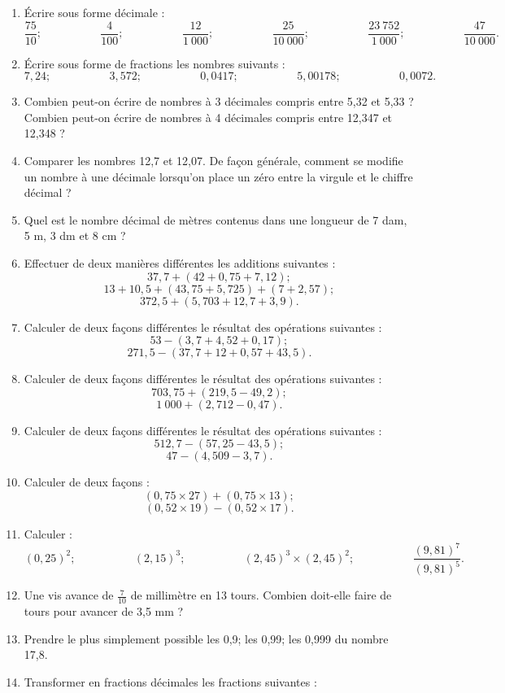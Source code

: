\documentclass[12 pt]{extarticle}
\theoremstyle{plain}
\begin{document}
 \begin{enumerate}
 \item Écrire sous forme décimale : 
 \[ \frac{75}{10};\phantom{meowmeow}\frac4{100};\phantom{meowmeow}\frac{12}{1~000};\phantom{meowmeow}\frac{25}{10~000};\phantom{meowmeow}\frac{23~752}{1~000};\phantom{meowmeow}\frac{47}{10~000}.\]
 \item Écrire sous forme de fractions les nombres suivants : 
 \[7,24; \phantom{meowmeow} 3,572;\phantom{meowmeow}
 0,0417;\phantom{meowmeow}5,00178;\phantom{meowmeow}
 0,0072.\]
 \item Combien peut-on écrire de nombres à 3 décimales compris entre 5,32 et 5,33 ? Combien peut-on écrire de nombres à 4 décimales compris entre 12,347 et 12,348 ? 
 \item Comparer les nombres 12,7 et 12,07. De façon générale, comment se modifie un nombre à une décimale lorsqu'on place un zéro entre la virgule et le chiffre décimal ?
 \item Quel est le nombre décimal de mètres contenus dans une longueur de 7 dam, 5 m, 3 dm et 8 cm ? 
 \item Effectuer de deux manières différentes les additions suivantes : 
 \[ 37,7 + (42+0,75+7,12);\] 
 \[ 13 + 10,5 + ( 43, 75 + 5,725) + (7 + 2,57) ; \]
 \[ 372, 5 + ( 5,703 + 12, 7 + 3,9).\]
 \item Calculer de deux façons différentes le résultat des opérations suivantes : 
 \[ 53 - ( 3,7 + 4,52 + 0,17);\]
 \[ 271,5 - (37,7 + 12 + 0,57 + 43,5).\]
 \item Calculer de deux façons différentes le résultat des opérations suivantes : 
 \[ 703,75 + (219,5-49,2);\]
 \[1~000 + (2,712-0,47).\]
 \item Calculer de deux façons différentes le résultat des opérations suivantes : 
 \[ 512,7-(57,25-43,5);\]
 \[47-(4,509-3,7).\]
 \item Calculer de deux façons : 
 \[ (0,75\times 27) + (0,75 \times 13); \]
 \[ (0,52\times 19) - (0,52 \times 17).\]
 \item Calculer : 
 \[ (0,25)^2; \phantom{meowmeow} (2,15)^3; \phantom{meowmeow}
 (2,45)^3 \times (2,45)^2; \phantom{meowmeow}
 \frac{(9,81)^7}{(9,81)^5}.\]
 \item Une vis avance de $\frac7{10}$ de millimètre en 13 tours. Combien doit-elle faire de tours pour avancer de 3,5 mm ? 
 \item Prendre le plus simplement possible les 0,9; les 0,99; les 0,999 du nombre 17,8. 
 \item Transformer en fractions décimales les fractions suivantes : 

\end{enumerate}
\end{document}
